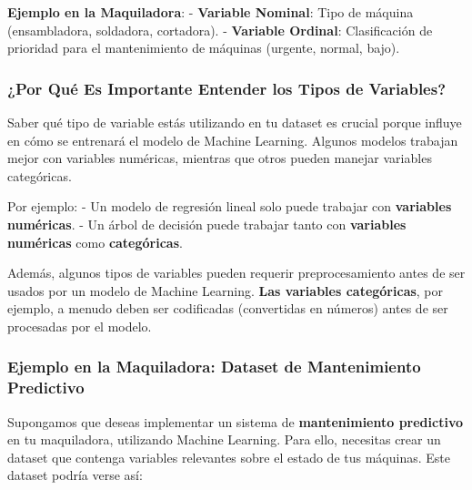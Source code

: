 \documentclass[
  10pt,
  letterpaper,
]{book}
\begin{document}
\textbf{Ejemplo en la Maquiladora}: - \textbf{Variable Nominal}: Tipo de
máquina (ensambladora, soldadora, cortadora). - \textbf{Variable
Ordinal}: Clasificación de prioridad para el mantenimiento de máquinas
(urgente, normal, bajo).

\subsubsection{¿Por Qué Es Importante Entender los Tipos de
Variables?}\label{por-quuxe9-es-importante-entender-los-tipos-de-variables}

Saber qué tipo de variable estás utilizando en tu dataset es crucial
porque influye en cómo se entrenará el modelo de Machine Learning.
Algunos modelos trabajan mejor con variables numéricas, mientras que
otros pueden manejar variables categóricas.

Por ejemplo: - Un modelo de regresión lineal solo puede trabajar con
\textbf{variables numéricas}. - Un árbol de decisión puede trabajar
tanto con \textbf{variables numéricas} como \textbf{categóricas}.

Además, algunos tipos de variables pueden requerir preprocesamiento
antes de ser usados por un modelo de Machine Learning. \textbf{Las
variables categóricas}, por ejemplo, a menudo deben ser codificadas
(convertidas en números) antes de ser procesadas por el modelo.

\subsubsection{Ejemplo en la Maquiladora: Dataset de Mantenimiento
Predictivo}\label{ejemplo-en-la-maquiladora-dataset-de-mantenimiento-predictivo}

Supongamos que deseas implementar un sistema de \textbf{mantenimiento
predictivo} en tu maquiladora, utilizando Machine Learning. Para ello,
necesitas crear un dataset que contenga variables relevantes sobre el
estado de tus máquinas. Este dataset podría verse así:
\end{document}
